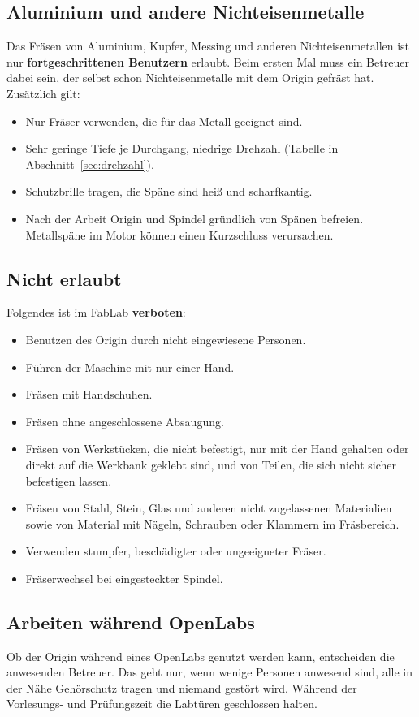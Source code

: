 \documentclass{\basedir/fablab-document}
\begin{document}
	\subsection{Aluminium und andere Nichteisenmetalle}
	\label{sec:aluminium}
	Das Fräsen von Aluminium, Kupfer, Messing und anderen Nichteisenmetallen ist nur \textbf{fortgeschrittenen Benutzern} erlaubt. Beim ersten Mal muss ein Betreuer dabei sein, der selbst schon Nichteisenmetalle mit dem Origin gefräst hat. Zusätzlich gilt:
	\begin{itemize}
		\item Nur Fräser verwenden, die für das Metall geeignet sind.
		\item Sehr geringe Tiefe je Durchgang, niedrige Drehzahl (Tabelle in Abschnitt~\ref{sec:drehzahl}).
		\item Schutzbrille tragen, die Späne sind heiß und scharfkantig.
		\item Nach der Arbeit Origin und Spindel gründlich von Spänen befreien. Metallspäne im Motor können einen Kurzschluss verursachen.
	\end{itemize}

	\subsection{Nicht erlaubt}
	Folgendes ist im FabLab \textbf{verboten}:
	\begin{itemize}
		\item Benutzen des Origin durch nicht eingewiesene Personen.
		\item Führen der Maschine mit nur einer Hand.
		\item Fräsen mit Handschuhen.
		\item Fräsen ohne angeschlossene Absaugung.
		\item Fräsen von Werkstücken, die nicht befestigt, nur mit der Hand gehalten oder direkt auf die Werkbank geklebt sind, und von Teilen, die sich nicht sicher befestigen lassen.
		\item Fräsen von Stahl, Stein, Glas und anderen nicht zugelassenen Materialien sowie von Material mit Nägeln, Schrauben oder Klammern im Fräsbereich.
		\item Verwenden stumpfer, beschädigter oder ungeeigneter Fräser.
		\item Fräserwechsel bei eingesteckter Spindel.
	\end{itemize}

	\subsection{Arbeiten während OpenLabs}
	Ob der Origin während eines OpenLabs genutzt werden kann, entscheiden die anwesenden Betreuer. Das geht nur, wenn wenige Personen anwesend sind, alle in der Nähe Gehörschutz tragen und niemand gestört wird. Während der Vorlesungs- und Prüfungszeit die Labtüren geschlossen halten.
\end{document}
